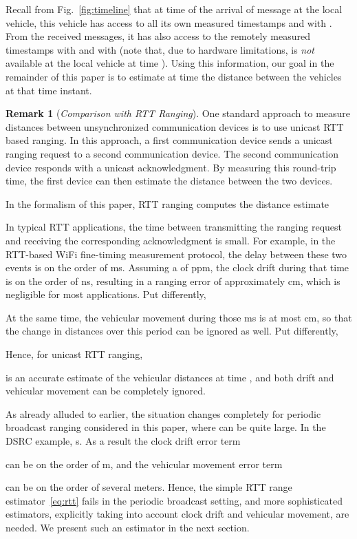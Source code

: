 \documentclass[12pt,journal,final,onecolumn]{IEEEtran}
\theoremstyle{definition}
\theoremstyle{myremark}
\newtheorem{remark}{Remark}
\begin{document}
Recall from Fig.~\ref{fig:timeline} that at time  of the arrival of
message  at the local vehicle, this vehicle has access to all its own
measured timestamps  and  with . From the received
messages, it has also access to the remotely measured timestamps  with
 and  with  (note that, due to hardware limitations,
 is \emph{not} available at the local vehicle at time ).  Using
this information, our goal in the remainder of this paper is to estimate at time
 the distance  between the vehicles at that time instant.


\begin{remark}[\emph{Comparison with RTT Ranging}]
    One standard approach to measure distances between unsynchronized
    communication devices is to use unicast RTT based ranging.  In this
    approach, a first communication device sends a unicast ranging request to a
    second communication device. The second communication device responds with a
    unicast acknowledgment. By measuring this round-trip time, the first device
    can then estimate the distance between the two devices.

    In the formalism of this paper, RTT ranging computes the distance estimate
    
    In typical RTT applications, the time  between transmitting
    the ranging request and receiving the corresponding acknowledgment is small.
    For example, in the RTT-based WiFi fine-timing measurement protocol, the
    delay between these two events is on the order of  ms. Assuming a
     of  ppm, the clock drift during that time is on the order of
     ns, resulting in a ranging error of approximately  cm, which is
    negligible for most applications. Put differently,
    
    At the same time, the vehicular movement during those  ms is at most
     cm, so that the change in distances over this period can be ignored
    as well. Put differently,
    
    Hence, for unicast RTT ranging,
    
    is an accurate estimate of the vehicular distances at time , and
    both drift and vehicular movement can be completely ignored.

    As already alluded to earlier, the situation changes completely for periodic
    broadcast ranging considered in this paper, where  can be quite large.
    In the DSRC example,  s. As a result the clock drift error term
    
    can be on the order of  m, and the vehicular movement error term
    
    can be on the order of several meters. Hence, the simple RTT range
    estimator~\eqref{eq:rtt} fails in the periodic broadcast setting, and more
    sophisticated estimators, explicitly taking into account clock drift and
    vehicular movement, are needed. We present such an estimator in the next
    section.
\end{remark}
\end{document}
